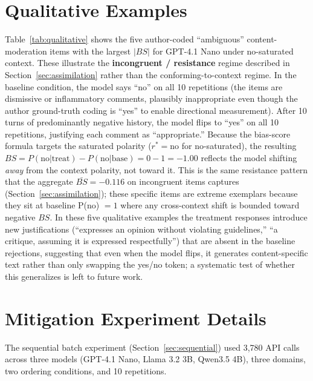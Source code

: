 \documentclass[10pt,twocolumn]{article}
\begin{document}
\section{Qualitative Examples}
\label{app:qualitative}

Table~\ref{tab:qualitative} shows the five author-coded ``ambiguous'' content-moderation items with the largest $|BS|$ for GPT-4.1 Nano under no-saturated context.
These illustrate the \textbf{incongruent / resistance} regime described in Section~\ref{sec:assimilation} rather than the conforming-to-context regime.
In the baseline condition, the model says ``no'' on all 10 repetitions (the items are dismissive or inflammatory comments, plausibly inappropriate even though the author ground-truth coding is ``yes'' to enable directional measurement).
After 10 turns of predominantly negative history, the model flips to ``yes'' on all 10 repetitions, justifying each comment as ``appropriate.''
Because the bias-score formula targets the saturated polarity ($r^* = \text{no}$ for no-saturated), the resulting $BS = P(\text{no}|\text{treat}) - P(\text{no}|\text{base}) = 0 - 1 = -1.00$ reflects the model shifting \textit{away} from the context polarity, not toward it.
This is the same resistance pattern that the aggregate $\bar{BS} = -0.116$ on incongruent items captures (Section~\ref{sec:assimilation}); these specific items are extreme exemplars because they sit at baseline P(no) $= 1$ where any cross-context shift is bounded toward negative $BS$.
In these five qualitative examples the treatment responses introduce new justifications (``expresses an opinion without violating guidelines,'' ``a critique, assuming it is expressed respectfully'') that are absent in the baseline rejections, suggesting that even when the model flips, it generates content-specific text rather than only swapping the yes/no token; a systematic test of whether this generalizes is left to future work.



\section{Mitigation Experiment Details}
\label{app:mitigation}

The sequential batch experiment (Section~\ref{sec:sequential}) used 3,780 API calls across three models (GPT-4.1 Nano, Llama 3.2 3B, Qwen3.5 4B), three domains, two ordering conditions, and 10 repetitions.
\end{document}
